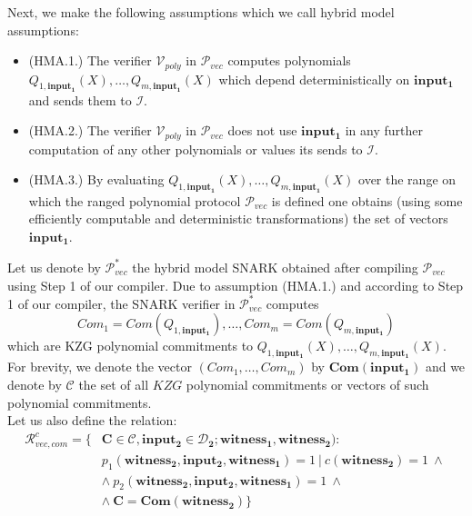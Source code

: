 \noindent Next, we make the following assumptions which we call hybrid model assumptions:
\begin{itemize}
\item (HMA.1.) The verifier $\mathcal{V}_{poly}$ in $\mathscr{P}_{\mathit{vec}}$ computes polynomials 
$\mathit{Q_{1,\mathbf{input_1}}}(X), \ldots, \mathit{Q_{m, \mathbf{input_1}}}(X)$ which depend deterministically on $\mathbf{input_1}$ and sends them to $\mathcal{I}$. 
\item (HMA.2.) The verifier $\mathcal{V}_{poly}$ in $\mathscr{P}_{\mathit{vec}}$ does not use $\mathbf{input_1}$ in any further computation of 
any other polynomials or values its sends to $\mathcal{I}$.
\item (HMA.3.) By evaluating $\mathit{Q_{1,\mathbf{input_1}}}(X), \ldots, \mathit{Q_{m, \mathbf{input_1}}}(X)$ over the range on which the ranged polynomial protocol 
$\mathscr{P}_{\mathit{vec}}$ is defined one obtains (using some efficiently computable and deterministic transformations) the set of vectors $\mathbf{input_1}$. 
\end{itemize} 
Let us denote by $\mathscr{P}^*_{\mathit{vec}}$ the hybrid model SNARK obtained after compiling $\mathscr{P}_{\mathit{vec}}$ using Step 1 of our compiler. 
Due to assumption (HMA.1.) and according to Step 1 of our compiler, the SNARK verifier in 
$\mathscr{P}^*_{\mathit{vec}}$ computes $$\mathit{Com_1} = \mathit{Com}(\mathit{Q_{1,\mathbf{input_1}}}), \ldots, \mathit{Com_m} = \mathit{Com}(\mathit{Q_{m,\mathbf{input_1}}})$$ 
which are KZG polynomial commitments to $\mathit{Q_{1,\mathbf{input_1}}}(X), \ldots, \mathit{Q_{m, \mathbf{input_1}}}(X)$. For brevity, we denote the vector
$(\mathit{Com_1}, \ldots, \mathit{Com_m})$ by $\mathbf{Com}(\mathbf{input_1})$ and we denote 
by $\mathcal{C}$ the set of all $\mathit{KZG}$ polynomial commitments or vectors of such polynomial commitments. \\

\noindent Let us also define the relation: 
\begin{align*}
\mathcal{R}_{\mathit{vec}, \mathit{com}}^c = \{& \mathbf{C} \in \mathcal{C}, \mathbf{input_2} \in \mathbf{\mathcal{D}_2}; \mathbf{witness_1}, \mathbf{witness_2}):  \\
& p_1(\mathbf{witness_2}, \mathbf{input_2}, \mathbf{witness_1}) =1  \ |\ c(\mathbf{witness_2}) = 1  \ \wedge\  \\
& \wedge\ p_2(\mathbf{witness_2}, \mathbf{input_2}, \mathbf{witness_1}) = 1\ \wedge \\
& \wedge\ \mathbf{C} = \mathbf{Com}(\mathbf{witness_2})\}
\end{align*}

